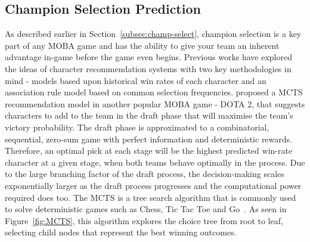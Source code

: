 \subsection{Champion Selection Prediction}\label{subsec:Champion Selection Prediction}
As described earlier in Section~\ref{subsec:champ-select}, champion selection is a key part of any MOBA game and has the ability to give your team an inherent advantage in-game before the game even begins.
Previous works have explored the ideas of character recommendation systems with two key methodologies in mind - models based upon historical win rates of each character and an association rule model based on common selection frequencies.
\citet{chen2018art} proposed a \ac{MCTS} recommendation model in another popular MOBA game - DOTA 2, that suggests characters to add to the team in the draft phase that will maximise the team's victory probability.
The draft phase is approximated to a combinatorial, sequential, zero-sum game with perfect information and deterministic rewards.
Therefore, an optimal pick at each stage will be the highest predicted win-rate character at a given stage, when both teams behave optimally in the process.
Due to the large branching factor of the draft process, the decision-making scales exponentially larger as the draft process progresses and the computational power required does too.
The \ac{MCTS} is a tree search algorithm that is commonly used to solve deterministic games such as Chess, Tic Tac Toe and Go~\citep{alphago2016}.
As seen in Figure~\ref{fig:MCTS}, this algorithm explores the choice tree from root to leaf, selecting child nodes that represent the best winning outcomes.

